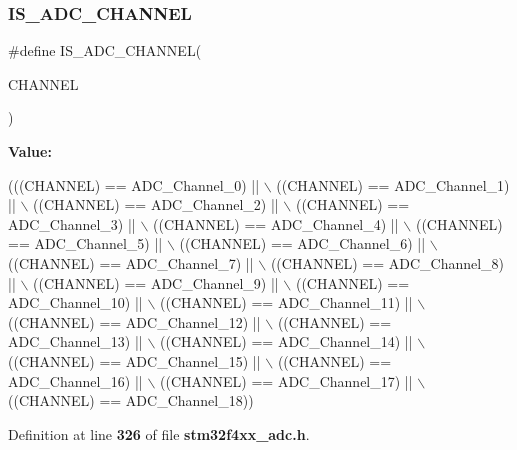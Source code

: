 \subsubsection{I\+S\+\_\+\+A\+D\+C\+\_\+\+C\+H\+A\+N\+N\+EL}
{\footnotesize\ttfamily \#define I\+S\+\_\+\+A\+D\+C\+\_\+\+C\+H\+A\+N\+N\+EL(\begin{DoxyParamCaption}\item[{}]{C\+H\+A\+N\+N\+EL }\end{DoxyParamCaption})}

{\bfseries Value\+:}
\begin{DoxyCode}
(((CHANNEL) == ADC_Channel_0) || \(\backslash\)
                                 ((CHANNEL) == ADC_Channel_1) || \(\backslash\)
                                 ((CHANNEL) == ADC_Channel_2) || \(\backslash\)
                                 ((CHANNEL) == ADC_Channel_3) || \(\backslash\)
                                 ((CHANNEL) == ADC_Channel_4) || \(\backslash\)
                                 ((CHANNEL) == ADC_Channel_5) || \(\backslash\)
                                 ((CHANNEL) == ADC_Channel_6) || \(\backslash\)
                                 ((CHANNEL) == ADC_Channel_7) || \(\backslash\)
                                 ((CHANNEL) == ADC_Channel_8) || \(\backslash\)
                                 ((CHANNEL) == ADC_Channel_9) || \(\backslash\)
                                 ((CHANNEL) == ADC_Channel_10) || \(\backslash\)
                                 ((CHANNEL) == ADC_Channel_11) || \(\backslash\)
                                 ((CHANNEL) == ADC_Channel_12) || \(\backslash\)
                                 ((CHANNEL) == ADC_Channel_13) || \(\backslash\)
                                 ((CHANNEL) == ADC_Channel_14) || \(\backslash\)
                                 ((CHANNEL) == ADC_Channel_15) || \(\backslash\)
                                 ((CHANNEL) == ADC_Channel_16) || \(\backslash\)
                                 ((CHANNEL) == ADC_Channel_17) || \(\backslash\)
                                 ((CHANNEL) == ADC_Channel_18))
\end{DoxyCode}


Definition at line \textbf{ 326} of file \textbf{ stm32f4xx\+\_\+adc.\+h}.


